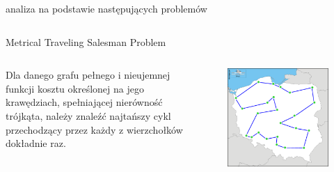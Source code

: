\documentclass[final,hyperref={pdfpagelabels=false}]{beamer}
\begin{document}
\begin{frame}
  \begin{columns}
    \begin{column}{.96\textwidth}
      \vspace{1cm}
      \begin{center}
        \veryHuge analiza na podstawie następujących problemów
      \end{center}
      \vspace{1cm}
    \end{column}
  \end{columns}

  \begin{columns}
    \begin{column}{.46\textwidth}
      \begin{block}{Metrical Traveling Salesman Problem}
        \begin{minipage}{\linewidth}
          \begin{columns}
            \begin{column}{.38\linewidth}
              Dla danego grafu pełnego i nieujemnej funkcji kosztu określonej na jego krawędziach, spełniającej nierówność trójkąta, należy znaleźć najtańszy
              cykl przechodzący przez każdy z wierzchołków dokładnie raz.
            \end{column}

            \begin{column}{.58\linewidth}
              \begin{figure}
                \centering
                \includegraphics[width=0.8\linewidth]{poland_cities_cycle.eps}
              \end{figure}
            \end{column}


\end{columns}
\end{minipage}
\end{block}
\end{column}
\end{columns}
\end{frame}
\end{document}
